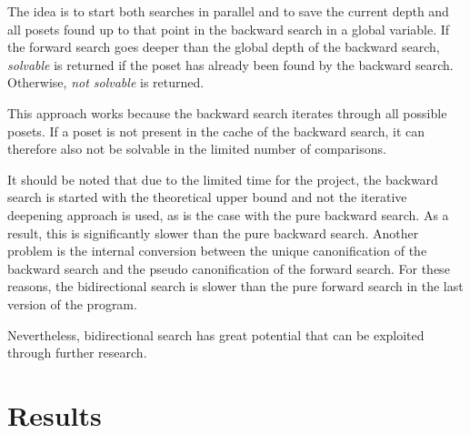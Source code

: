 \documentclass[10pt,journal,compsoc]{IEEEtran}
\newtheorem{lemma}{Lemma}
\begin{document}
The idea is to start both searches in parallel and to save the current depth and all posets found up to that point in the backward search in a global variable.
If the forward search goes deeper than the global depth of the backward search, \textit{solvable} is returned if the poset has already been found by the backward search.
Otherwise, \textit{not solvable} is returned.

This approach works because the backward search iterates through all possible posets.
If a poset is not present in the cache of the backward search, it can therefore also not be solvable in the limited number of comparisons.

It should be noted that due to the limited time for the project, the backward search is started with the theoretical upper bound and not the iterative deepening approach is used, as is the case with the pure backward search.
As a result, this is significantly slower than the pure backward search.
Another problem is the internal conversion between the unique canonification of the backward search and the pseudo canonification of the forward search.
For these reasons, the bidirectional search is slower than the pure forward search in the last version of the program.

Nevertheless, bidirectional search has great potential that can be exploited through further research.



\section{Results}
\end{document}
